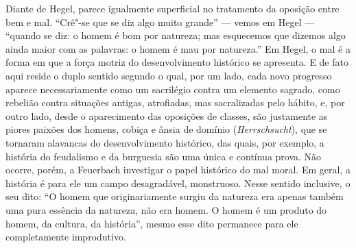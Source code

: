 Diante de
 Hegel,
parece igualmente superficial no tratamento da oposição entre bem e mal.
``Crê"-se que se diz algo muito grande'' --- vemos
em Hegel ---
``quando se diz: o homem é bom por natureza; mas esquecemos que dizemos
algo ainda maior com as palavras: o homem é mau por natureza.''
Em Hegel,
o mal é a forma em que a força motriz do desenvolvimento histórico se
apresenta. E de fato aqui reside o duplo sentido segundo o qual, por um
lado, cada novo progresso aparece necessariamente como um sacrilégio
contra um elemento sagrado, como rebelião contra situações antigas,
atrofiadas, mas sacralizadas pelo hábito, e, por outro lado, desde o
aparecimento das oposições de classes, são justamente as piores paixões
dos homens, cobiça e ânsia de domínio (\emph{Herrschsucht}), que se
tornaram alavancas do desenvolvimento histórico, das quais, por exemplo,
a história do feudalismo e da burguesia são uma única e contínua prova.
Não ocorre, porém, a
Feuerbach 
investigar o papel histórico do mal moral. Em geral, a história é para
ele um campo desagradável, monstruoso. Nesse sentido inclusive, o seu
dito: ``O homem que originariamente surgiu da natureza era apenas também
uma pura essência da natureza, não era homem. O homem é um produto do
homem, da cultura, da história'', mesmo esse
dito permanece para ele completamente improdutivo.

